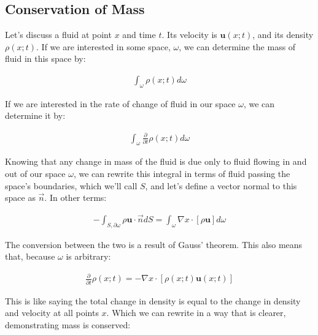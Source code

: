 \documentclass[12pt]{report}
\begin{document}
\subsection{Conservation of Mass}

Let's discuss a fluid at point $x$ and time $t$. Its velocity is $\mathbf{u}(x;t)$, and its density $\rho(x;t)$. If we are interested in some space, $\omega$, we can determine the mass of fluid in this space by: 

\begin{equation} \label{phenom1}
\begin{split}
\int_\omega \rho(x;t)d\omega
\end{split}
\end{equation}

If we are interested in the rate of change of fluid in our space $\omega$, we can determine it by:

\begin{equation} \label{phenom1}
\begin{split}
\int_\omega
\frac{\partial}{\partial t}\rho(x;t)d\omega
\end{split}
\end{equation}

Knowing that any change in mass of the fluid is due only to fluid flowing in and out of our space $\omega$, we can rewrite this integral in terms of fluid passing the space's boundaries, which we'll call $S$, and let's define a vector normal to this space as $\Vec{n}$. In other terms: 

\begin{equation} \label{phenom1}
\begin{split}
-\int_{S,\partial\omega}
\rho \mathbf{u} \cdot \Vec{n}dS = \int_\omega \nabla x \cdot [\rho \mathbf{u}]d\omega
\end{split}
\end{equation}


The conversion between the two is a result of Gauss' theorem. This also means that, because $\omega$ is arbitrary: 

\begin{equation} \label{phenom1}
\begin{split}
\frac{\partial}{\partial t}\rho(x;t) = -\nabla x\cdot [\rho(x;t)\mathbf{u}(x;t)]
\end{split}
\end{equation}

This is like saying the total change in density is equal to the change in density and velocity at all points $x$. Which we can rewrite in a way that is clearer, demonstrating mass is conserved: 
\end{document}
